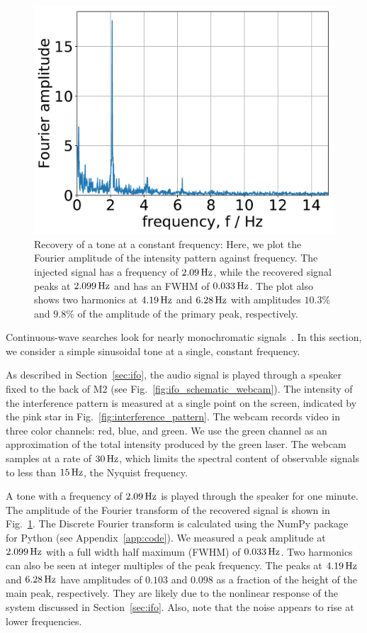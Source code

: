 \documentclass[paper-main.tex]{subfiles}
\begin{document}
\begin{figure}
	\includegraphics[width=.5\textwidth]{figures/webcam_spectrum_expt_4_0209.pdf}
	\caption{\label{fig:webcam_spectrum}
Recovery of a tone at a constant frequency: Here, we plot the Fourier amplitude of the intensity pattern against frequency.
The injected signal has a frequency of $2.09\,{\rm Hz}$, while the recovered signal peaks at $2.099\,{\rm Hz}$ and has an FWHM of $0.033\,{\rm Hz}$.
The plot also shows two harmonics at $4.19\,{\rm Hz}$ and $6.28\,{\rm Hz}$ with amplitudes $10.3 \%$ and $9.8 \%$ of the amplitude of the primary peak, respectively.
}	
\end{figure}



Continuous-wave searches look for nearly monochromatic signals~\cite{JKS:1998}. In this section, we consider a simple sinusoidal tone at a single, constant frequency. 


As described in Section~\ref{sec:ifo}, the audio signal is played through a speaker fixed to the back of M2 (see Fig.~\ref{fig:ifo_schematic_webcam}). 
The intensity of the interference pattern is measured at a single point on the screen, indicated by the pink star in Fig.~\ref{fig:interference_pattern}. 
The webcam records video in three color channels: red, blue, and green. 
We use the green channel as an approximation of the total intensity produced by the green laser.
The webcam samples at a rate of $30\, {\rm Hz}$, which limits the spectral content of observable signals to less than $15\,{\rm Hz}$, the Nyquist frequency. 



A tone with a frequency of $2.09\,{\rm Hz}$ is played through the speaker for one minute. 
The amplitude of the Fourier transform of the recovered signal is shown in Fig.~\ref{fig:webcam_spectrum}. The Discrete Fourier transform is calculated using the NumPy package for Python (see Appendix~\ref{app:code}).
We measured a peak amplitude at $2.099\,{\rm Hz}$ with a full width half maximum (FWHM) of $0.033\,{\rm Hz}$.
Two harmonics can also be seen at integer multiples of the peak frequency. 
The peaks at $4.19\,{\rm Hz}$ and $6.28\,{\rm Hz}$ have amplitudes of $0.103$ and $0.098$ as a fraction of the height of the main peak, respectively. They are likely due to the nonlinear response of the system discussed in Section~\ref{sec:ifo}.
Also, note that the noise appears to rise at lower frequencies.
\end{document}
